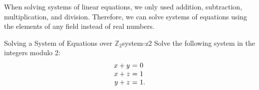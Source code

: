 When solving systems of linear equations, we only used addition,
subtraction, multiplication, and division. Therefore, we can solve
systems of equations using the elements of any field instead of real numbers.

\begin{example}{Solving a System of Equations over $\mathbb{Z}_2$}{system-z2}
  Solve the following system in the integers modulo 2:
  \begin{equation*}
    \begin{array}{r@{~}c@{~}l}
      x + y     &=& 0 \\
      x     + z &=& 1 \\
          y + z &=& 1.
    \end{array}
  \end{equation*}
\end{example}

